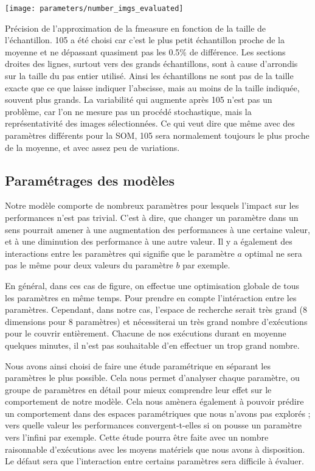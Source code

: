 	\begin{figureth}
		\texttt{[image: parameters/number\_imgs\_evaluated]}
		\caption[Échantillonage de l'évaluation]{Précision de l'approximation de la fmeasure en fonction de la taille de l'échantillon. 105 a été choisi car c'est le plus petit échantillon proche de la moyenne et ne dépassant quasiment pas les 0.5\% de différence. Les sections droites des lignes, surtout vers des grands échantillons, sont à cause d'arrondis sur la taille du pas entier utilisé. Ainsi les échantillons ne sont pas de la taille exacte que ce que laisse indiquer l'abscisse, mais au moins de la taille indiquée, souvent plus grands. La variabilité qui augmente après 105 n'est pas un problème, car l'on ne mesure pas un procédé stochastique, mais la représentativité des images sélectionnées. Ce qui veut dire que même avec des paramètres différents pour la SOM, 105 sera normalement toujours le plus proche de la moyenne, et avec assez peu de variations.}\label{fig:params:nbimgs}
	\end{figureth}

	\subsection{Paramétrages des modèles}

	Notre modèle comporte de nombreux paramètres pour lesquels l'impact sur les performances n'est pas trivial. C'est à dire, que changer un paramètre dans un sens pourrait amener à une augmentation des performances à une certaine valeur, et à une diminution des performance à une autre valeur. Il y a également des interactions entre les paramètres qui signifie que le paramètre $a$ optimal ne sera pas le même pour deux valeurs du paramètre $b$ par exemple. 

	En général, dans ces cas de figure, on effectue une optimisation globale de tous les paramètres en même temps. Pour prendre en compte l'intéraction entre les paramètres. Cependant, dans notre cas, l'espace de recherche serait très grand (8 dimensions pour 8 paramètres) et nécessiterai un très grand nombre d'exécutions pour le couvrir entièrement. Chacune de nos exécutions durant en moyenne quelques minutes, il n'est pas souhaitable d'en effectuer un trop grand nombre.

	Nous avons ainsi choisi de faire une étude paramétrique en séparant les paramètres le plus possible. Cela nous permet d'analyser chaque paramètre, ou groupe de paramètres en détail pour mieux comprendre leur effet sur le comportement de notre modèle. Cela nous amènera également à pouvoir prédire un comportement dans des espaces paramétriques que nous n'avons pas explorés ; vers quelle valeur les performances convergent-t-elles si on pousse un paramètre vers l'infini par exemple. Cette étude pourra être faite avec un nombre raisonnable d'exécutions avec les moyens matériels que nous avons à disposition. Le défaut sera que l'interaction entre certains paramètres sera difficile à évaluer.

